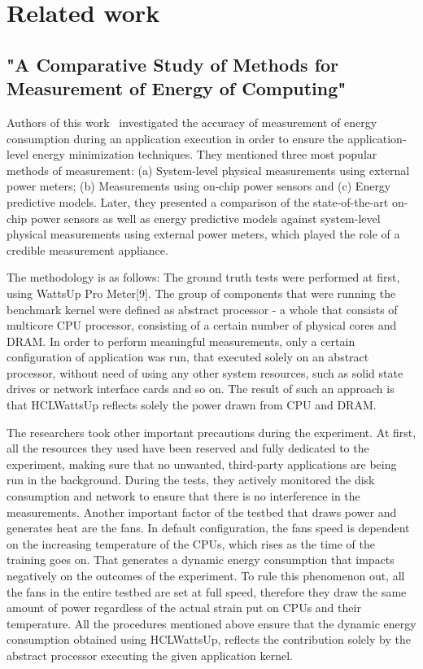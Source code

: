 \chapter{Related work}

\section{"A Comparative Study of Methods for Measurement
of Energy of Computing"}

Authors of this work~\cite{State_of_the_Art_Article_1}
investigated the accuracy of measurement of energy consumption
during an application execution in order to ensure the
application-level energy minimization techniques.
They mentioned three most popular methods of measurement:
(a) System-level physical measurements using external power meters;
(b) Measurements using on-chip power sensors and (c) Energy
predictive models. Later, they presented a comparison of the
state-of-the-art on-chip power sensors as well as energy
predictive models against system-level physical measurements
using external power meters, which played the role of a credible
measurement appliance.

The methodology is as follows: The ground truth tests were
performed at first, using WattsUp Pro Meter[9]. The group of
components that were running the benchmark kernel were defined
as abstract processor - a whole that consists of multicore CPU
processor, consisting of a certain number of physical cores and
DRAM. In order to perform meaningful measurements, only a certain
configuration of application was run, that executed solely on an
abstract processor, without need of using any other system
resources, such as solid state drives or network interface cards
and so on. The result of such an approach is that HCLWattsUp
reflects solely the power drawn from CPU and DRAM.

The researchers took other important precautions during the
experiment. At first, all the resources they used have been
reserved and fully dedicated to the experiment, making sure
that no unwanted, third-party applications are being run in
the background. During the tests, they actively monitored the
disk consumption and network to ensure that there is no
interference in the measurements. Another important factor of
the testbed that draws power and generates heat are the fans.
In default configuration, the fans speed is dependent on the
increasing temperature of the CPUs, which rises as the time of
the training goes on. That generates a dynamic energy consumption
that impacts negatively on the outcomes of the experiment.
To rule this phenomenon out, all the fans in the entire testbed
are set at full speed, therefore they draw the same amount of
power regardless of the actual strain put on CPUs and their
temperature. All the procedures mentioned above ensure that the
dynamic energy consumption obtained using HCLWattsUp, reflects
the contribution solely by the abstract processor executing the
given application kernel.

